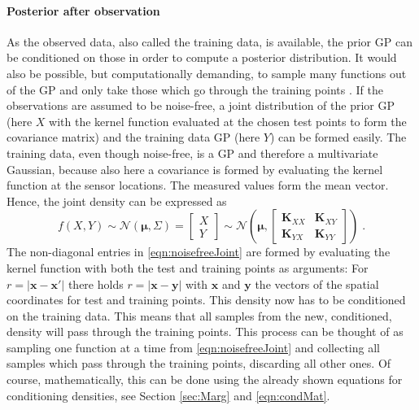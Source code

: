 \documentclass[%
  a4paper,oneside,%
  11pt,%
  smallchapters,
  style=printdev,
  extramargin,
  green,%
  rgb, <cmyk>
  ]{tubsbook}
\begin{document}
\paragraph{Posterior after observation}
\label{sec:GPcond}
As the observed data, also called the training data, is available, the prior GP can be conditioned on those in order to compute a posterior distribution. It would also be possible, but computationally demanding, to sample many functions out of the GP and only take those which go through the training points \cite[pp. 15, 16]{rasmussen2006}. If the observations are assumed to be noise-free, a joint distribution of the prior GP (here $X$ with the kernel function evaluated at the chosen test points to form the covariance matrix) and the training data GP (here $Y$) can be formed easily. The training data, even though noise-free, is a GP and therefore a multivariate Gaussian, because also here a covariance is formed by evaluating the kernel function at the sensor locations. The measured values form the mean vector. Hence, the joint density can be expressed as
%
\begin{equation}
f(X,Y) \sim \mathcal{N}(\bm{\mu},\Sigma) = \begin{bmatrix}
           X \\
           Y
         \end{bmatrix} \sim \mathcal{N}\left( \bm{\mu}, \begin{bmatrix}
\bm{K}_{XX} & \bm{K}_{XY} \\
\bm{K}_{YX} & \bm{K}_{YY} 
\end{bmatrix}  \right) \; .
\label{eqn:noisefreeJoint}
\end{equation}
The non-diagonal entries in \eqref{eqn:noisefreeJoint} are formed by evaluating the kernel function with both the test and training points as arguments: For $r = |\bm{x}-\bm{x'}|$ there holds $r = |\bm{x} - \bm{y}|$ with $\bm{x}$ and $\bm{y}$ the vectors of the spatial coordinates for test and training points.
This density now has to be conditioned on the training data. This means that all samples from the new, conditioned, density will pass through the training points. This process can be thought of as sampling one function at a time from \eqref{eqn:noisefreeJoint} and collecting all samples which pass through the training points, discarding all other ones. Of course, mathematically, this can be done using the already shown equations for conditioning densities, see Section \ref{sec:Marg} and \eqref{eqn:condMat}.
\end{document}
